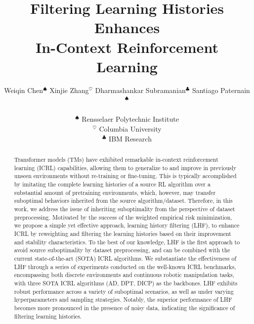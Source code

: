 \documentclass{article}
\title{Filtering Learning Histories Enhances \\ In-Context Reinforcement Learning}
\author{
  Weiqin Chen$^\spadesuit$ \quad Xinjie Zhang$^\heartsuit
$ \quad Dharmashankar Subramanian$^\clubsuit$ \quad Santiago Paternain$^\spadesuit$  \\ \\
  $^\spadesuit$ Rensselaer Polytechnic Institute \\
  $^\heartsuit$ Columbia University \\
  $^\clubsuit$ IBM Research
}
\begin{document}
\maketitle
\begin{abstract}
Transformer models (TMs) have exhibited remarkable in-context reinforcement learning (ICRL) capabilities, allowing them to generalize to and improve in previously unseen environments without re-training or fine-tuning. This is typically accomplished by imitating the complete learning histories of a source RL algorithm over a substantial amount of pretraining environments, which, however, may transfer suboptimal behaviors inherited from the source algorithm/dataset. Therefore, in this work, we address the issue of inheriting suboptimality from the perspective of dataset preprocessing. Motivated by the success of the weighted empirical risk minimization, we propose a simple yet effective approach, learning history filtering (LHF), to enhance ICRL by reweighting and filtering the learning histories based on their improvement and stability characteristics. To the best of our knowledge, LHF is the first approach to avoid source suboptimality by dataset preprocessing, and can be combined with the current state-of-the-art (SOTA) ICRL algorithms. We substantiate the effectiveness of LHF through a series of experiments conducted on the well-known ICRL benchmarks, encompassing both discrete environments and continuous robotic manipulation tasks, with three SOTA ICRL algorithms (AD, DPT, DICP) as the backbones. LHF exhibits robust performance across a variety of suboptimal scenarios, as well as under varying hyperparameters and sampling strategies. Notably, the superior performance of LHF becomes more pronounced in the presence of noisy data, indicating the significance of filtering learning histories.
\end{abstract}
\end{document}
